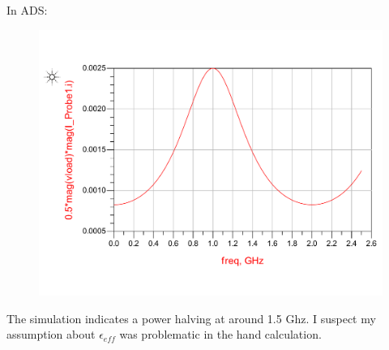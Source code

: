 \documentclass[11pt]{article}
\begin{document}
\begin{enumerate}
	In ADS:
	
	\begin{figure}[H]
		\centering \includegraphics[width=\textwidth-4cm]{images/problem3d.pdf}
	\end{figure}

	The simulation indicates a power halving at around 1.5 Ghz. I suspect my assumption about $\epsilon_{eff}$ was problematic in the hand calculation.
\end{enumerate}
\end{document}
